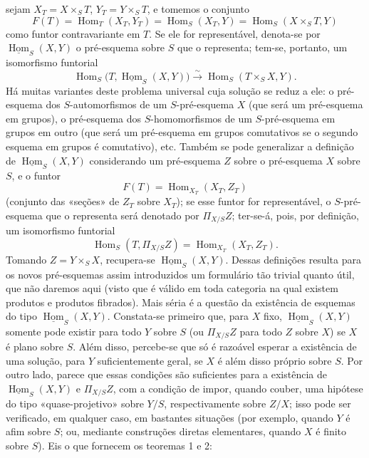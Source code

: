 \documentclass[11pt,twoside,openany]{book}
\numberwithin{equation}{section}
\newcommand{\src}[1]{%
  \phantomsection\hypertarget{src:#1}{}%
  \marginpar{\raggedleft\footnotesize\sffamily #1}%
}
\theoremstyle{plain}
\theoremstyle{definition}
\theoremstyle{remark}
\newcommand{\FgaUnitKey}{frontmatter}
\renewcommand{\src}[1]{%
  \phantomsection\hypertarget{src:\FgaUnitKey:#1}{}%
  \marginpar{\raggedleft\footnotesize\sffamily #1}%
}
\begin{document}
\src{381}
sejam $X_T=X\times_ST$, $Y_T=Y\times_ST$, e tomemos o conjunto
\[
  F(T)=\operatorname{Hom}_T(X_T,Y_T)
      =\operatorname{Hom}_S(X_T,Y)
      =\operatorname{Hom}_S(X\times_ST,Y)
\]
como funtor contravariante em $T$. Se ele for representável, denota-se por
$\underline{\operatorname{Hom}}_S(X,Y)$ o pré-esquema sobre $S$ que o
representa; tem-se, portanto, um isomorfismo funtorial
\[
  \operatorname{Hom}_S
  \bigl(T,\underline{\operatorname{Hom}}_S(X,Y)\bigr)
  \xrightarrow{\sim}
  \operatorname{Hom}_S(T\times_SX,Y).
\]
Há muitas variantes deste problema universal cuja solução se reduz a ele:
o pré-esquema dos $S$-automorfismos de um $S$-pré-esquema $X$ (que será um
pré-esquema em grupos), o pré-esquema dos $S$-homomorfismos de um
$S$-pré-esquema em grupos em outro (que será um pré-esquema em grupos comutativos
se o segundo esquema em grupos é comutativo), etc. Também se pode
generalizar a definição de $\underline{\operatorname{Hom}}_S(X,Y)$
considerando um pré-esquema $Z$ sobre o pré-esquema $X$ sobre $S$, e o funtor
\[
  F(T)=\operatorname{Hom}_{X_T}(X_T,Z_T)
\]
(conjunto das «seções» de $Z_T$ sobre $X_T$); se esse funtor for
representável, o $S$-pré-esquema que o representa será denotado por
$\Pi_{X/S}Z$; ter-se-á, pois, por definição, um isomorfismo funtorial
\[
  \operatorname{Hom}_S(T,\Pi_{X/S}Z)
  =\operatorname{Hom}_{X_T}(X_T,Z_T).
\]
Tomando $Z=Y\times_SX$, recupera-se
$\underline{\operatorname{Hom}}_S(X,Y)$. Dessas definições resulta para os
novos pré-esquemas assim introduzidos um formulário tão trivial quanto útil, que não
daremos aqui (visto que é válido em toda categoria na qual existem
produtos e produtos fibrados). Mais séria é a questão da existência de
esquemas do tipo $\underline{\operatorname{Hom}}_S(X,Y)$. Constata-se primeiro
que, para $X$ fixo, $\underline{\operatorname{Hom}}_S(X,Y)$ somente pode existir
para todo $Y$ sobre $S$ (ou $\Pi_{X/S}Z$ para todo $Z$ sobre $X$) se $X$ é plano
sobre $S$. Além disso, percebe-se que só é razoável esperar a existência de
uma solução, para $Y$ suficientemente geral, se $X$ é além disso próprio sobre
$S$. Por outro lado, parece que essas condições são suficientes para a
existência de $\underline{\operatorname{Hom}}_S(X,Y)$ e $\Pi_{X/S}Z$, com a
condição de impor, quando couber, uma hipótese do tipo «quase-projetivo»
sobre $Y/S$, respectivamente sobre $Z/X$; isso pode ser verificado, em qualquer
caso, em bastantes situações (por exemplo, quando $Y$ é afim sobre $S$; ou,
mediante construções diretas elementares, quando $X$ é finito sobre $S$).
Eis o que fornecem os teoremas 1 e 2:
\end{document}
